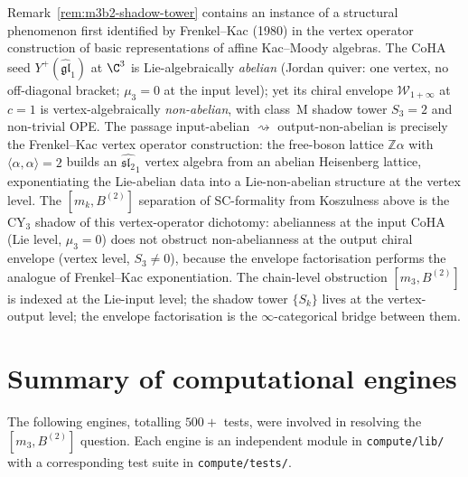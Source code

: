 \begin{remark}
\label{rem:m3b2-DNA-frenkel-kac}
Remark~\ref{rem:m3b2-shadow-tower} contains an instance of a
structural phenomenon first identified by Frenkel--Kac (1980) in
the vertex operator construction of basic representations of
affine Kac--Moody algebras.  The CoHA seed $Y^+(\widehat{\mathfrak{gl}}_1)$
at $\C^3$ is Lie-algebraically \emph{abelian} (Jordan quiver: one
vertex, no off-diagonal bracket; $\mu_3 = 0$ at the input level);
yet its chiral envelope
$\mathcal{W}_{1+\infty}$ at $c = 1$ is vertex-algebraically
\emph{non-abelian}, with class~M shadow tower $S_3 = 2$ and
non-trivial OPE.  The passage input-abelian $\rightsquigarrow$ output-non-abelian
is precisely the Frenkel--Kac vertex operator construction:
the free-boson lattice $\mathbb{Z}\alpha$ with $\langle \alpha,
\alpha \rangle = 2$ builds an $\widehat{\mathfrak{sl}_2}_1$ vertex
algebra from an abelian Heisenberg lattice, exponentiating the
Lie-abelian data into a Lie-non-abelian structure at the vertex
level.  The $[m_k, B^{(2)}]$ separation of SC-formality from
Koszulness above is the CY$_3$ shadow of this vertex-operator
dichotomy: abelianness at the input CoHA (Lie level,
$\mu_3 = 0$) does not obstruct non-abelianness at the output
chiral envelope (vertex level, $S_3 \neq 0$), because the
envelope factorisation performs the analogue of Frenkel--Kac
exponentiation.  The chain-level obstruction
$[m_3, B^{(2)}]$ is indexed at the Lie-input level; the shadow
tower $\{S_k\}$ lives at the vertex-output level; the envelope
factorisation is the $\infty$-categorical bridge between them.
\end{remark}


\section{Summary of computational engines}
\label{sec:m3b2-engines}

The following engines, totalling $500+$ tests, were involved in
resolving the $[m_3, B^{(2)}]$ question.  Each engine is an
independent module in \texttt{compute/lib/} with a corresponding
test suite in \texttt{compute/tests/}.

